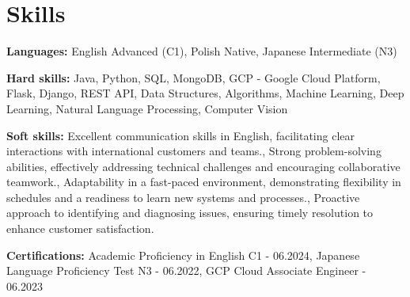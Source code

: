 \documentclass[10pt, letterpaper]{article}
\begin{document}
\section*{Skills}
\noindent\textbf{Languages:} 
English Advanced (C1), Polish Native, Japanese Intermediate (N3)
\vspace{5pt}

\noindent\textbf{Hard skills:}
Java, Python, SQL, MongoDB, GCP - Google Cloud Platform, Flask, Django, REST API, Data Structures, Algorithms, Machine Learning, Deep Learning, Natural Language Processing, Computer Vision
\vspace{5pt}

\noindent\textbf{Soft skills:}
Excellent communication skills in English, facilitating clear interactions with international customers and teams., Strong problem-solving abilities, effectively addressing technical challenges and encouraging collaborative teamwork., Adaptability in a fast-paced environment, demonstrating flexibility in schedules and a readiness to learn new systems and processes., Proactive approach to identifying and diagnosing issues, ensuring timely resolution to enhance customer satisfaction.
\vspace{5pt}

\noindent\textbf{Certifications:}
Academic Proficiency in English C1 - 06.2024, Japanese Language Proficiency Test N3 - 06.2022, GCP Cloud Associate Engineer - 06.2023
\end{document}
